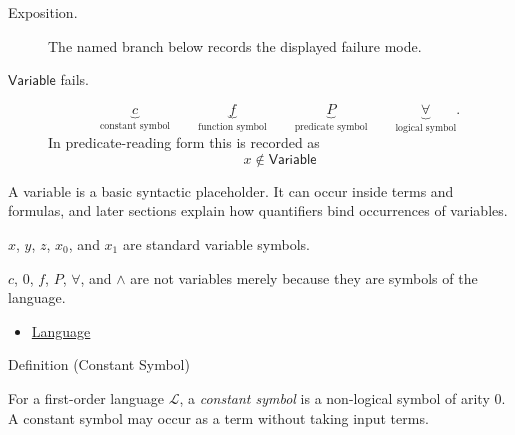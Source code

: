 \begin{remark*}
\begin{description}
  \item[Exposition.] The named branch below records the displayed failure mode.
\item[\(\mathsf{Variable}\) fails.] \[
\underbrace{c}_{\text{constant symbol}}
\qquad
\underbrace{f}_{\text{function symbol}}
\qquad
\underbrace{P}_{\text{predicate symbol}}
\qquad
\underbrace{\forall}_{\text{logical symbol}}.
\]
  In predicate-reading form this is recorded as
  \[
    x\notin\mathsf{Variable}
  \]
\end{description}
\end{remark*}

\begin{remark*}[Interpretation]
A variable is a basic syntactic placeholder. It can occur inside terms and
formulas, and later sections explain how quantifiers bind occurrences of
variables.
\end{remark*}

\begin{remark*}[Examples]
\(x\), \(y\), \(z\), \(x_0\), and \(x_1\) are standard variable symbols.
\end{remark*}

\begin{remark*}
\(c\), \(0\), \(f\), \(P\), \(\forall\), and \(\land\) are not variables merely
because they are symbols of the language.
\end{remark*}

\begin{dependencies}
\begin{itemize}
  \item \hyperref[def:language]{Language}
\end{itemize}
\end{dependencies}

\begin{definitionbox}{Definition (Constant Symbol)}
\begin{definition}
\label{def:constant-symbol}
For a first-order language \(\mathcal L\), a \emph{constant symbol} is a
non-logical symbol of arity \(0\). A constant symbol may occur as a term without
taking input terms.
\end{definition}
\end{definitionbox}

